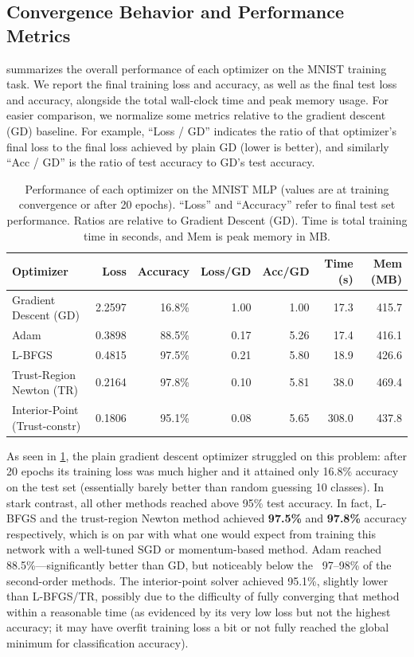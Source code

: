 \documentclass[12pt]{article}
\begin{document}
\subsection{Convergence Behavior and Performance Metrics}
 summarizes the overall performance of each optimizer on the MNIST training task. We report the final training loss and accuracy, as well as the final test loss and accuracy, alongside the total wall-clock time and peak memory usage. For easier comparison, we normalize some metrics relative to the gradient descent (GD) baseline. For example, “Loss / GD” indicates the ratio of that optimizer’s final loss to the final loss achieved by plain GD (lower is better), and similarly “Acc / GD” is the ratio of test accuracy to GD’s test accuracy.

\begin{table}[ht]\centering
\caption{Performance of each optimizer on the MNIST MLP (values are at training convergence or after 20 epochs). “Loss” and “Accuracy” refer to final test set performance. Ratios are relative to Gradient Descent (GD). Time is total training time in seconds, and Mem is peak memory in MB.}
\label{tab:performance}
\begin{tabular}{lrrrrrr}
\toprule
Optimizer & Loss & Accuracy & Loss/GD & Acc/GD & Time (s) & Mem (MB) \\
\midrule
Gradient Descent (GD)      & 2.2597 & 16.8\% & 1.00 & 1.00 & 17.3 & 415.7 \\
Adam                       & 0.3898 & 88.5\% & 0.17 & 5.26 & 17.4 & 416.1 \\
L-BFGS                     & 0.4815 & 97.5\% & 0.21 & 5.80 & 18.9 & 426.6 \\
Trust-Region Newton (TR)   & 0.2164 & 97.8\% & 0.10 & 5.81 & 38.0 & 469.4 \\
Interior-Point (Trust-constr) & 0.1806 & 95.1\% & 0.08 & 5.65 & 308.0 & 437.8 \\
\bottomrule
\end{tabular}
\end{table}

As seen in \cref{tab:performance}, the plain gradient descent optimizer struggled on this problem: after 20 epochs its training loss was much higher and it attained only 16.8\% accuracy on the test set (essentially barely better than random guessing 10 classes). In stark contrast, all other methods reached above 95\% test accuracy. In fact, L-BFGS and the trust-region Newton method achieved \textbf{97.5\%} and \textbf{97.8\%} accuracy respectively, which is on par with what one would expect from training this network with a well-tuned SGD or momentum-based method. Adam reached 88.5\%—significantly better than GD, but noticeably below the ~97–98\% of the second-order methods. The interior-point solver achieved 95.1\%, slightly lower than L-BFGS/TR, possibly due to the difficulty of fully converging that method within a reasonable time (as evidenced by its very low loss but not the highest accuracy; it may have overfit training loss a bit or not fully reached the global minimum for classification accuracy).
\end{document}
